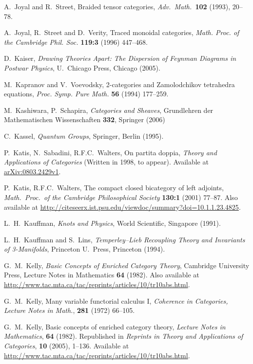 \documentclass[12pt,twoside,openright]{report}
\begin{document}
\begin{thebibliography}{99}
A.\ Joyal and R.\ Street, Braided tensor categories,
\textsl{Adv.\ Math.\ }\textbf{102} (1993), 20--78.

 A.\ Joyal, R.\ Street and D.\ Verity, Traced monoidal categories, \textsl{Math. Proc. of the Cambridge Phil. Soc.} \textbf{119:3} (1996) 447--468.

D.\ Kaiser, \textsl{Drawing Theories Apart: The Dispersion of Feynman Diagrams in Postwar Physics}, U.\ Chicago Press, Chicago (2005).

 M.\ Kapranov and V.\ Voevodsky, 2-categories and Zamolodchikov tetrahedra equations, \textsl{Proc. Symp. Pure Math.} \textbf{56} (1994) 177--259.

 M.\ Kashiwara, P.\ Schapira, \textsl{Categories and Sheaves}, Grundlehren der Mathematischen Wissenschaften \textbf{332}, Springer (2006)

 C.\ Kassel, \textsl{Quantum Groups}, Springer, Berlin (1995).

 P.\ Katis, N.\ Sabadini, R.F.C.\ Walters, On partita doppia, \textsl{Theory and Applications of Categories} (Written in 1998, to appear).  Available at \href{http://arxiv.org/abs/0803.2429}{arXiv:0803.2429v1}.

 P.\ Katis, R.F.C.\ Walters, The compact closed bicategory of left adjoints, \textsl{Math.\ Proc.\ of the Cambridge Philosophical Society} \textbf{130:1} (2001) 77--87.  Also available at \href{http://citeseerx.ist.psu.edu/viewdoc/summary?doi=10.1.1.23.4825}{http://citeseerx.ist.psu.edu/viewdoc/summary?doi=10.1.1.23.4825}.

L.\ H.\ Kauffman, {\sl Knots and Physics}, World Scientific, Singapore (1991).

L.\ H.\ Kauffman and S.\ Lins, {\sl Temperley--Lieb Recoupling Theory and Invariants of 3-Manifolds}, Princeton U.\ Press, Princeton (1994).

 G.\ M.\ Kelly, \textsl{Basic Concepts of Enriched Category Theory}, Cambridge University Press, Lecture Notes in Mathematics \textbf{64} (1982).  Also available at \href{http://www.tac.mta.ca/tac/reprints/articles/10/tr10abs.html}{http://www.tac.mta.ca/tac/reprints/articles/10/tr10abs.html}.

 G.\ M.\ Kelly, Many variable functorial calculus I, \textsl{Coherence in Categories, Lecture Notes in Math.}, \textbf{281} (1972) 66--105.

 G.\ M.\ Kelly, Basic concepts of enriched category theory, \textsl{Lecture Notes in Mathematics}, \textbf{64} (1982).  Republished in \textsl{Reprints in Theory and Applications of Categories}, \textbf{10} (2005), 1--136.  Available at \href{http://www.tac.mta.ca/tac/reprints/articles/10/tr10abs.html}{http://www.tac.mta.ca/tac/reprints/articles/10/tr10abs.html}.


\end{thebibliography}
\end{document}
